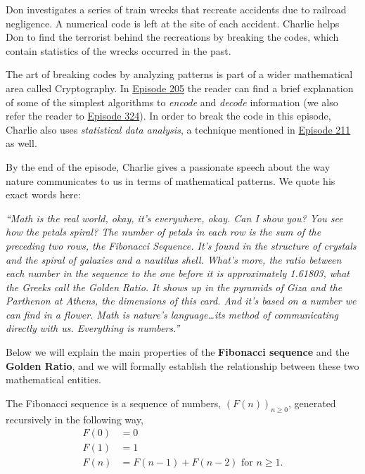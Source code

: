 \newpage
{}
{}
\setcounter{activity}{0}

Don investigates a series of train wrecks that recreate accidents due to railroad negligence. A numerical code is left at the site of each accident. Charlie helps Don to find the terrorist behind the recreations by breaking the codes, which contain statistics of the wrecks occurred in the past.


The art of breaking codes by analyzing patterns is part of a wider mathematical area called Cryptography. In \hyperref[ep205]{Episode 205} the reader can find a brief explanation of some of the simplest algorithms to \emph{encode} and \emph{decode} information (we also refer the reader to \hyperref[ep324]{Episode 324}). In order to break the code in this episode, Charlie also uses \emph{statistical data analysis}, a technique mentioned in \hyperref[ep211]{Episode 211} as well.


By the end of the episode, Charlie gives a passionate speech about the way nature communicates to us in terms of mathematical patterns. We quote his exact words here: 
	\begin{center}
	\begin{minipage}{0.75\textwidth}
	\emph{``Math is the real world, okay, it's everywhere, okay. Can I show you? You see how the petals spiral? The number of petals in each row is the sum of the preceding two rows, the Fibonacci Sequence. It's found in the structure of crystals and the spiral of galaxies and a nautilus shell. What's more, the ratio between each number in the sequence to the one before it is approximately 1.61803, what the Greeks call the Golden Ratio. It shows up in the pyramids of Giza and the Parthenon at Athens, the dimensions of this card. And it's based on a number we can find in a flower. Math is nature's language\dots its method of communicating directly with us. Everything is numbers.''}
	\end{minipage}
	\end{center}


Below we will explain the main properties of the \textbf{Fibonacci sequence} and the \textbf{Golden Ratio}, and we will formally establish the relationship between these two mathematical entities.




\textcolor{CornellRed}{The Fibonacci sequence} is a sequence of numbers, $(F(n))_{n \geq 0}$, generated recursively in the following way,
	\[
	\begin{split}
	F(0)&= 0 \\
	F(1)&= 1 \\
	F(n)&= F(n-1) + F(n-2) \text{ for } n \geq 1.
	\end{split}
	\]


